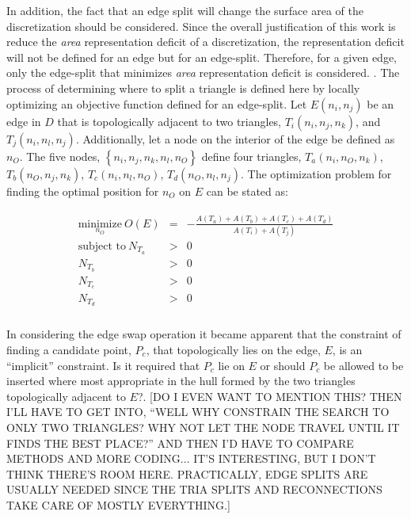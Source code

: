 In addition, the fact that an edge split will change the surface area of
the discretization should be considered. Since the overall justification
of this work is reduce the {\it area} representation deficit of a
discretization, the representation deficit will not be defined for an
edge but for an edge-split. Therefore, for a given edge, only the
edge-split that minimizes {\it area} representation deficit is
considered.  . The process of determining where to split a triangle is
defined here by locally optimizing an objective function defined for an
edge-split.  Let $E\left(n_i,n_j\right)$ be an edge in $D$ that is
topologically adjacent to two triangles, $T_i\left(n_i,n_j,n_k\right)$,
and $T_j\left(n_i,n_l,n_j\right)$. Additionally, let a node on the
interior of the edge be defined as $n_O$. The five nodes,
$\left\{n_i,n_j,n_k,n_l,n_O\right\}$ define four triangles,
$T_a\left(n_i,n_O,n_k\right)$, $T_b\left(n_O,n_j, n_k\right)$,
$T_c\left(n_i,n_l,n_O\right)$, $T_d\left(n_O,n_l,n_j\right)$.  The
optimization problem for finding the optimal position for $n_O$ on $E$
can be stated as:

\begin{eqnarray*}
\begin{array}{rcl}
\underset{n_O}{\text{minimize}} \ O(E) & = & - \frac{ A\left(T_a\right) + A\left(T_b\right) + A\left(T_c\right) + A\left(T_d\right) }{ A\left(T_i\right) + A\left(T_j\right) } \\
\text{subject to} \ N_{T_a} & > & 0 \\
N_{T_b} & > & 0 \\ 
N_{T_c} & > & 0 \\
N_{T_d} & > & 0 \\
\end{array}
\end{eqnarray*}

In considering the edge swap operation it became apparent that the
constraint of finding a candidate point, $P_c$, that topologically lies
on the edge, $E$, is an ``implicit'' constraint. Is it required that
$P_c$ lie on $E$ or should $P_c$ be allowed to be inserted where most
appropriate in the hull formed by the two triangles topologically
adjacent to $E$?. [DO I EVEN WANT TO MENTION THIS? THEN I'LL HAVE TO GET
INTO, ``WELL WHY CONSTRAIN THE SEARCH TO ONLY TWO TRIANGLES? WHY NOT LET
THE NODE TRAVEL UNTIL IT FINDS THE BEST PLACE?'' AND THEN I'D HAVE TO
COMPARE METHODS AND MORE CODING... IT'S INTERESTING, BUT I DON'T THINK
THERE'S ROOM HERE. PRACTICALLY, EDGE SPLITS ARE USUALLY NEEDED SINCE THE
TRIA SPLITS AND RECONNECTIONS TAKE CARE OF MOSTLY EVERYTHING.]

